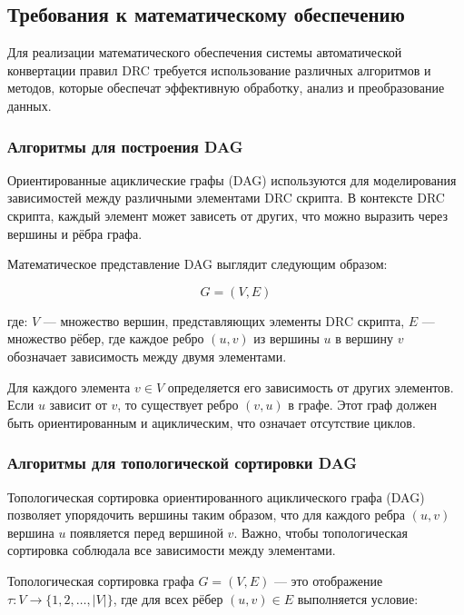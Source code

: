 \subsection{Требования к математическому обеспечению}

Для реализации математического обеспечения
системы автоматической конвертации правил DRC требуется использование
различных алгоритмов и методов, которые обеспечат эффективную обработку,
анализ и преобразование данных.

\subsubsection{Алгоритмы для построения DAG}

Ориентированные ациклические графы (DAG) используются
для моделирования зависимостей между различными элементами DRC скрипта.
В контексте DRC скрипта, каждый элемент может зависеть от других,
что можно выразить через вершины и рёбра графа.

Математическое представление DAG выглядит следующим образом:

\begin{equation}
G = (V, E)
\end{equation}

где: \( V \) --- множество вершин, представляющих элементы DRC скрипта,
\( E \) --- множество рёбер,
где каждое ребро \( (u, v) \) из вершины \( u \) в вершину \( v \)
обозначает зависимость между двумя элементами.

Для каждого элемента \( v \in V \)
определяется его зависимость от других элементов.
Если \( u \) зависит от \( v \), то существует ребро \( (v, u) \) в графе.
Этот граф должен быть ориентированным и ациклическим,
что означает отсутствие циклов.

\subsubsection{Алгоритмы для топологической сортировки DAG}

Топологическая сортировка ориентированного ациклического графа (DAG)
позволяет упорядочить вершины таким образом, что для каждого ребра \((u, v)\)
вершина \( u \) появляется перед вершиной \( v \).
Важно, чтобы топологическая сортировка соблюдала
все зависимости между элементами.

Топологическая сортировка графа
\( G = (V, E) \) --- это отображение \( \tau: V \to \{1, 2, \dots, |V|\} \),
где для всех рёбер \( (u, v) \in E \) выполняется условие:

